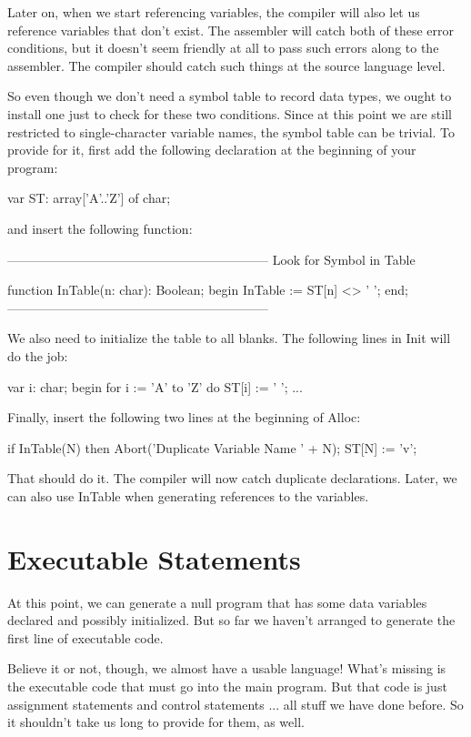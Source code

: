 \documentclass[float=false, crop=false]{standalone}
\begin{document}
Later on, when we start referencing variables, the compiler will also let us
reference variables that don't exist. The assembler will catch both of these
error conditions, but it doesn't seem friendly at all to pass such errors along
to the assembler. The compiler should catch such things at the source language
level.

So even though we don't need a symbol table to record data types, we ought to
install one just to check for these two conditions. Since at this point we are
still restricted to single-character variable names, the symbol table can be
trivial. To provide for it, first add the following declaration at the beginning
of your program:


     var ST: array['A'..'Z'] of char;


and insert the following function:

\begin{code}
{--------------------------------------------------------------}
{ Look for Symbol in Table }

function InTable(n: char): Boolean;
begin
   InTable := ST[n] <> ' ';
end;
{--------------------------------------------------------------}
\end{code}

We also need to initialize the table to all blanks. The following lines in Init
will do the job:


var i: char;
begin
   for i := 'A' to 'Z' do
      ST[i] := ' ';
   ...


Finally, insert the following two lines at the beginning of Alloc:


   if InTable(N) then Abort('Duplicate Variable Name ' + N);
   ST[N] := 'v';


That should do it. The compiler will now catch duplicate declarations. Later, we
can also use InTable when generating references to the variables.


\section{Executable Statements}

At this point, we can generate a null program that has some data variables
declared and possibly initialized. But so far we haven't arranged to generate
the first line of executable code.

Believe it or not, though, we almost have a usable language! What's missing is
the executable code that must go into the main program. But that code is just
assignment statements and control statements ... all stuff we have done before.
So it shouldn't take us long to provide for them, as well.
\end{document}
